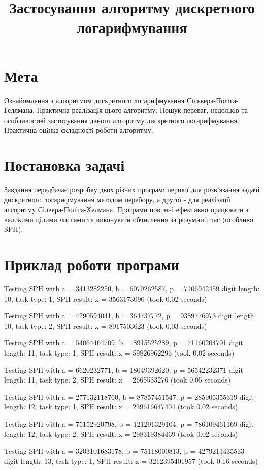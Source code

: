 \documentclass{article}
\title{Застосування алгоритму дискретного логарифмування}
\date{}
\begin{document}
\maketitle

\section{Мета}
\quad Ознайомлення з алгоритмом дискретного логарифмування Сiльвера-Полiга-Геллмана. Практична реалiзацiя цього алгоритму. Пошук переваг, недолiкiв та особливостей застосування даного алгоритму дискретного логарифмування. Практична оцiнка складностi роботи алгоритму.

\section{Постановка задачі}
\quad Завдання передбачає розробку двох різних програм: першої для розв'язання задачі дискретного логарифмування методом перебору, а другої - для реалізації алгоритму Сілвера-Поліга-Хелмана. Програми повинні ефективно працювати з великими цілими числами та виконувати обчислення за розумний час (особливо SPH).

\section{Приклад роботи програми}
\quad 
Testing SPH with a = 3413282250, b = 6079262587, p = 7106942459
digit length: 10, task type: 1, SPH result: x = 3563173090 (took 0.02 seconds)

Testing SPH with a = 4290594041, b = 364737772, p = 9389776973
digit length: 10, task type: 2, SPH result: x = 8017503623 (took 0.03 seconds)

Testing SPH with a = 54064464709, b = 8915525289, p = 71160204701
digit length: 11, task type: 1, SPH result: x = 59826962296 (took 0.02 seconds)

Testing SPH with a = 6620232771, b = 18049392620, p = 56542232371
digit length: 11, task type: 2, SPH result: x = 2665533276 (took 0.05 seconds)

Testing SPH with a = 277132118760, b = 87857451547, p = 285905355319
digit length: 12, task type: 1, SPH result: x = 239616647404 (took 0.02 seconds)

Testing SPH with a = 75152920798, b = 121291329104, p = 786109461169
digit length: 12, task type: 2, SPH result: x = 298319384469 (took 0.02 seconds)

Testing SPH with a = 3203101683178, b = 75118000813, p = 4279211435533
digit length: 13, task type: 1, SPH result: x = 3212395401957 (took 0.16 seconds)
\end{document}
